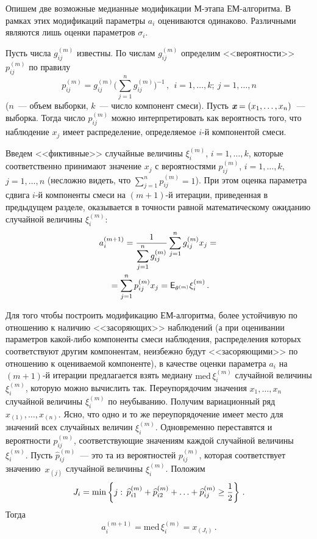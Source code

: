 \begin{multicols}{2}
Опишем две возможные медианные модификации М-этапа ЕМ-алгоритма. В
рамках этих модификаций параметры $a_i$ оцениваются одинаково.
Различными являются лишь оценки параметров $\sigma_i$.

Пусть числа $g_{ij}^{(m)}$ известны. По числам $g_{ij}^{(m)}$
определим <<вероятности>> $p_{ij}^{(m)}$ по правилу
$$
p_{ij}^{(m)}=g_{ij}^{(m)}\bigg(\sum\limits_{j=1}^{n}g_{ij}^{(m)}\bigg)^{-1}\,,\  \ i=1,\ldots,k;\ j=1,\ldots,n$$
($n$~--- объем выборки, $k$~--- число компонент смеси). Пусть
$\emph{\textbf{x}} =(x_1,\ldots,x_n)$~--- выборка. Тогда число
$p_{ij}^{(m)}$ можно интерпретировать как вероятность того, что
наблюдение $x_j$ имеет распределение, определяемое $i$-й
компонентой смеси.

Введем <<фиктивные>> случайные величины $\xi_i^{(m)}$,
$i=1,\ldots,k$, которые соответственно принимают значение $x_j$ с
вероятностями $p_{ij}^{(m)}$, $i=1,\ldots,k$, $j=1,\ldots,n$
(несложно видеть, что $\sum\limits_{j=1}^{n}p_{ij}^{(m)}=1$). При этом
оценка параметра сдвига $i$-й компоненты смеси на $(m+1)$-й
итерации, приведенная в предыду\-щем разделе, оказывается в точности
равной математическому ожиданию случайной величины $\xi_i^{(m)}$:
\begin{multline*}
a_{i}^{(m+1)}=\displaystyle\frac{\displaystyle 1\mathstrut}{\displaystyle \sum\limits_{j=1}^{n}g_{ij}^{(m)}\mathstrut}
\sum\limits_{j=1}^{n}g_{ij}^{(m)}x_{j}={}\\
{}=\sum\limits_{j=1}^{n}p_{ij}^{(m)}x_{j}={\sf
E}_{\theta^{(m)}}\xi_i^{(m)}\,.
\end{multline*}

Для того чтобы построить модификацию ЕМ-алгоритма, более
устойчивую по отношению к наличию <<засоряющих>> наблюдений (а при
оценивании параметров какой-либо компоненты смеси\linebreak
наблюдения,
распределения которых соответствуют другим компонентам, неизбежно
будут <<засоряющими>> по отношению к оцениваемой компоненте), в
качестве оценки параметра $a_i$ на $(m+1)$-й итерации предлагается
взять медиану $\mathrm{med}\,\xi_i^{(m)}$ случайной величины
$\xi_i^{(m)}$, которую можно вычислить так. Переупорядочим
значения $x_1,\ldots,x_n$ случайной величины $\xi_i^{(m)}$ по
неубыванию. Получим вариационный ряд $x_{(1)},\ldots,x_{(n)}$.
Ясно, что одно и то же переупорядочение имеет место для значений
всех случайных величин $\xi_i^{(m)}$. Одновременно переставятся и
вероятности $p_{ij}^{(m)}$, соответствующие значениям каждой
случайной величины $\xi_i^{(m)}$. Пусть $\widehat p_{ij}^{(m)}$~---
это та из вероятностей $p_{ij}^{(m)}$, которая соответствует
значению~$x_{(j)}$ случайной величины $\xi_i^{(m)}$. Положим
$$
J_i=\min \left \{ j:\, \widehat p_{i1}^{(m)}+\widehat p_{i2}^{(m)}+\ldots+\widehat
p_{ij}^{(m)}\ge \displaystyle\frac{\displaystyle 1\mathstrut}{\displaystyle 2\mathstrut}\right \}\,.
$$
Тогда
\begin{equation}
a_i^{(m+1)}=\mathrm {med}\,\xi_i^{(m)}=x_{(J_i)}\,.
\end{equation}


\end{multicols}
